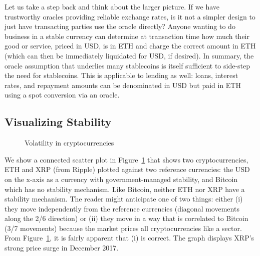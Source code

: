 Let us take a step back and think about the larger picture. If we have trustworthy oracles providing reliable exchange rates, is it not a simpler design to just have transacting parties use the oracle directly? Anyone wanting to do business in a stable currency can determine at transaction time how much their good or service, priced in USD, is in ETH and charge the correct amount in ETH (which can then be immediately liquidated for USD, if desired). In summary, the oracle assumption that underlies many stablecoins is itself sufficient to side-step the need for stablecoins. This is applicable to lending as well: loans, interest rates, and repayment amounts can be denominated in USD but paid in ETH using a spot conversion via an oracle.


\subsection{Visualizing Stability}\label{sec:stability}

\begin{figure}[t!]
	\centering
	\hfill
	\caption{Volatility in cryptocurrencies}
	\label{fig:fiatandcrypto}
\end{figure}

We show a connected scatter plot in Figure~\ref{fig:fiatandcrypto} that shows two cryptocurrencies, ETH and XRP (from Ripple) plotted against two reference currencies: the USD on the x-axis as a currency with government-managed stability, and Bitcoin which has no stability mechanism. Like Bitcoin, neither ETH nor XRP have a stability mechanism. The reader might anticipate one of two things: either (i) they move independently from the reference currencies (diagonal movements along the 2/6 direction) or (ii) they move in a way that is correlated to Bitcoin (3/7 movements) because the market prices all cryptocurrencies like a sector. From Figure~\ref{fig:fiatandcrypto}, it is fairly apparent that (i) is correct. The graph displays XRP's strong price surge in December 2017.


